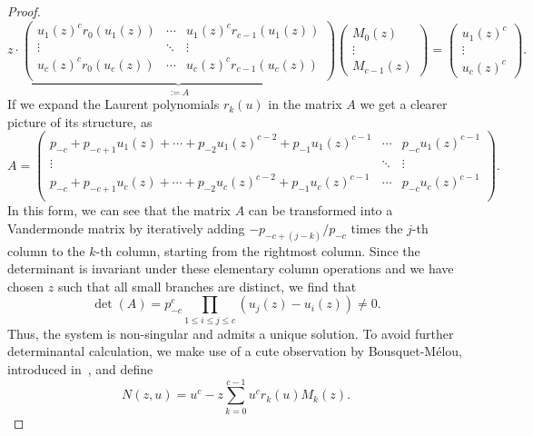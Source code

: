 \begin{proof}
  \begin{equation*}
    z \cdot
    \underbrace{\begin{pmatrix}
      u_1(z)^c r_0(u_1(z)) & \cdots & u_1(z)^c r_{c-1}(u_1(z)) \\
      \vdots & \ddots & \vdots \\
      u_c(z)^c r_0(u_c(z)) & \cdots & u_c(z)^c r_{c-1}(u_c(z)) \\
    \end{pmatrix}}_{:= A}
    \begin{pmatrix}
      M_0(z) \\ \vdots \\ M_{c-1}(z)
    \end{pmatrix}
    =
    \begin{pmatrix}
      u_1(z)^c \\ \vdots \\ u_c(z)^c
    \end{pmatrix}.
  \end{equation*}
  If we expand the Laurent polynomials $r_k(u)$ in the matrix $A$ we get a clearer picture of its structure, as 
  \begin{equation*}
    A = \begin{pmatrix}
      p_{-c} + p_{-c+1}u_1(z) + \cdots + p_{-2}u_1(z)^{c-2} + p_{-1}u_1(z)^{c-1} & \cdots & p_{-c} u_1(z)^{c-1} \\
      \vdots & \ddots & \vdots \\
      p_{-c} + p_{-c+1}u_c(z) + \cdots + p_{-2}u_c(z)^{c-2} + p_{-1}u_c(z)^{c-1} & \cdots & p_{-c} u_c(z)^{c-1} \\
    \end{pmatrix}.
  \end{equation*}
  In this form, we can see that the matrix $A$ can be transformed into a Vandermonde matrix by iteratively adding $-p_{-c + (j - k)}/p_{-c}$ times the $j$-th column to the $k$-th column, starting from the rightmost column.
  Since the determinant is invariant under these elementary column operations and we have chosen $z$ such that all small branches are distinct, we find that 
  $$
    \det(A) = p_{-c}^c \prod_{1 \leq i \leq j \leq c}(u_j(z) - u_i(z)) \neq 0.
  $$
  Thus, the system is non-singular and admits a unique solution.
  To avoid further determinantal calculation, we make use of a cute observation by Bousquet-Mélou, introduced in~\cite{LinearRecurrences}, and define
  \begin{equation}
    \label{eq:constant_term1}
    N(z,u) = u^c - z\sum_{k=0}^{c-1}u^c r_k(u)M_k(z).
  \end{equation}

\end{proof}

